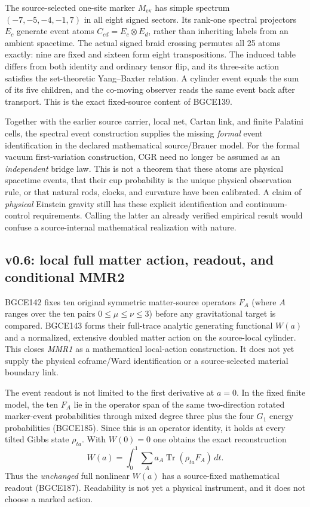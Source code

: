 \documentclass[11pt]{article}
\theoremstyle{definition}
\theoremstyle{remark}
\begin{document}
The source-selected one-site marker $M_{\mathrm{ev}}$ has simple spectrum $(-7,-5,-4,-1,7)$ in all eight signed sectors. Its rank-one spectral projectors $E_c$ generate event atoms $C_{cd}=E_c\otimes E_d$, rather than inheriting labels from an ambient spacetime. The actual signed braid crossing permutes all 25 atoms exactly: nine are fixed and sixteen form eight transpositions. The induced table differs from both identity and ordinary tensor flip, and its three-site action satisfies the set-theoretic Yang--Baxter relation. A cylinder event equals the sum of its five children, and the co-moving observer reads the same event back after transport. This is the exact fixed-source content of BGCE139.

Together with the earlier source carrier, local net, Cartan link, and finite Palatini cells, the spectral event construction supplies the missing \emph{formal} event identification in the declared mathematical source/Brauer model. For the formal vacuum first-variation construction, CGR need no longer be assumed as an \emph{independent} bridge law. This is not a theorem that these atoms are physical spacetime events, that their cup probability is the unique physical observation rule, or that natural rods, clocks, and curvature have been calibrated. A claim of \emph{physical} Einstein gravity still has these explicit identification and continuum-control requirements. Calling the latter an already verified empirical result would confuse a source-internal mathematical realization with nature.

\subsection{v0.6: local full matter action, readout, and conditional MMR2}\label{sec:v06mmr}

BGCE142 fixes ten original symmetric matter-source operators $F_A$ (where $A$ ranges over the ten pairs $0\leq\mu\leq\nu\leq3$) before any gravitational target is compared. BGCE143 forms their full-trace analytic generating functional $W(a)$ and a normalized, extensive doubled matter action on the source-local cylinder. This closes \emph{MMR1} as a mathematical local-action construction. It does not yet supply the physical coframe/Ward identification or a source-selected material boundary link.

The event readout is not limited to the first derivative at $a=0$. In the fixed finite model, the ten $F_A$ lie in the operator span of the same two-direction rotated marker-event probabilities through mixed degree three plus the four $G_1$ energy probabilities (BGCE185). Since this is an operator identity, it holds at every tilted Gibbs state $\rho_{ta}$. With $W(0)=0$ one obtains the exact reconstruction
\begin{equation}\label{eq:fullWreadout}
 W(a)=\int_0^1\sum_A a_A\operatorname{Tr}(\rho_{ta}F_A)\,dt .
\end{equation}
Thus the \emph{unchanged} full nonlinear $W(a)$ has a source-fixed mathematical readout (BGCE187). Readability is not yet a physical instrument, and it does not choose a marked action.
\end{document}
